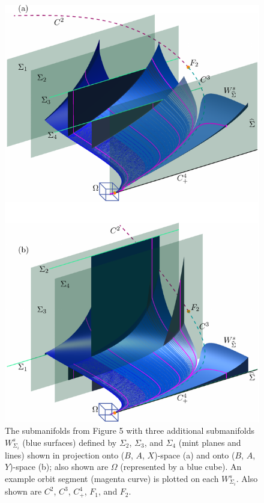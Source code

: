 \documentclass{ws-ijbc}
\begin{document}
\begin{figure}[H]
\centering
\includegraphics[]{./figures/MKMO_6.pdf}
\caption{The submanifolds from Figure 5 with three additional submanifolds $W^s_{\Sigma_i}$ (blue surfaces) defined by $\Sigma_2$, $\Sigma_3$, and $\Sigma_4$ (mint planes and lines) shown in projection onto ($B$, $A$, $X$)-space (a) and onto ($B$, $A$, $Y$)-space (b); also shown are $\Omega$ (represented by a blue cube).  An example orbit segment (magenta curve) is plotted on each $W^s_{\Sigma_i}$.  Also shown are $C^2$, $C^3$, $C^4_+$, $F_1$, and $F_2$.}
\label{figure_6}
\end{figure}
\end{document}
